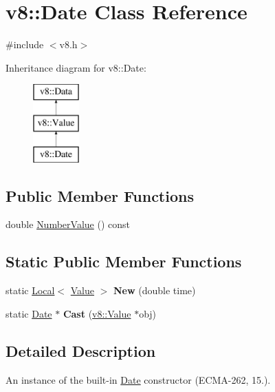 \hypertarget{classv8_1_1_date}{}\section{v8\+:\+:Date Class Reference}
\label{classv8_1_1_date}


{\ttfamily \#include $<$v8.\+h$>$}

Inheritance diagram for v8\+:\+:Date\+:\begin{figure}[H]
\begin{center}
\leavevmode
\includegraphics[height=3.000000cm]{classv8_1_1_date}
\end{center}
\end{figure}
\subsection*{Public Member Functions}
\begin{DoxyCompactItemize}
\item 
double \hyperlink{classv8_1_1_date_a00ae69718a3810d82ae0b54b28d53512}{Number\+Value} () const 
\end{DoxyCompactItemize}
\subsection*{Static Public Member Functions}
\begin{DoxyCompactItemize}
\item 
\hypertarget{classv8_1_1_date_a137e2318408130a5321413a58f977615}{}static \hyperlink{classv8_1_1_local}{Local}$<$ \hyperlink{classv8_1_1_value}{Value} $>$ {\bfseries New} (double time)\label{classv8_1_1_date_a137e2318408130a5321413a58f977615}

\item 
\hypertarget{classv8_1_1_date_a8e5ea7c1f28924b82922270d6596b4d3}{}static \hyperlink{classv8_1_1_date}{Date} $\ast$ {\bfseries Cast} (\hyperlink{classv8_1_1_value}{v8\+::\+Value} $\ast$obj)\label{classv8_1_1_date_a8e5ea7c1f28924b82922270d6596b4d3}

\end{DoxyCompactItemize}


\subsection{Detailed Description}
An instance of the built-\/in \hyperlink{classv8_1_1_date}{Date} constructor (E\+C\+M\+A-\/262, 15.). 

